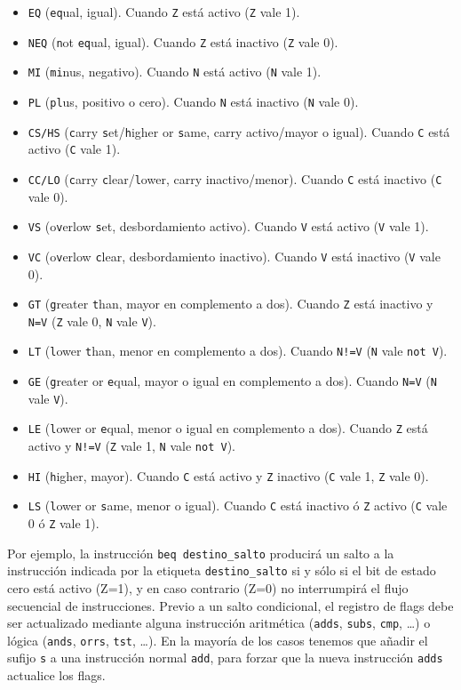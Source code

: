 \begin{itemize}
  \item{\tt EQ} ({\tt eq}ual, igual). Cuando {\tt Z} está activo ({\tt Z} vale 1).
  \item{\tt NEQ} ({\tt n}ot {\tt eq}ual, igual). Cuando {\tt Z} está inactivo ({\tt Z} vale 0).
  \item{\tt MI} ({\tt mi}nus, negativo). Cuando {\tt N} está activo ({\tt N} vale 1).
  \item{\tt PL} ({\tt pl}us, positivo o cero). Cuando {\tt N} está inactivo ({\tt N} vale 0).
  \item{\tt CS/HS} ({\tt c}arry {\tt s}et/{\tt h}igher or {\tt s}ame, carry activo/mayor o igual). Cuando {\tt C} está activo ({\tt C} vale 1).
  \item{\tt CC/LO} ({\tt c}arry {\tt c}lear/{\tt l}ower, carry inactivo/menor). Cuando {\tt C} está inactivo ({\tt C} vale 0).
  \item{\tt VS} (o{\tt v}erlow {\tt s}et, desbordamiento activo). Cuando {\tt V} está activo ({\tt V} vale 1).
  \item{\tt VC} (o{\tt v}erlow {\tt c}lear, desbordamiento inactivo). Cuando {\tt V} está inactivo ({\tt V} vale 0).
  \item{\tt GT} ({\tt g}reater {\tt t}han, mayor en complemento a dos). Cuando {\tt Z} está inactivo y {\tt N=V} ({\tt Z} vale 0, {\tt N} vale {\tt V}).
  \item{\tt LT} ({\tt l}ower {\tt t}han, menor en complemento a dos). Cuando {\tt N!=V} ({\tt N} vale {\tt not V}).
  \item{\tt GE} ({\tt g}reater or {\tt e}qual, mayor o igual en complemento a dos). Cuando {\tt N=V} ({\tt N} vale {\tt V}).
  \item{\tt LE} ({\tt l}ower or {\tt e}qual, menor o igual en complemento a dos). Cuando {\tt Z} está activo y {\tt N!=V} ({\tt Z} vale 1, {\tt N} vale {\tt not V}).
  \item{\tt HI} ({\tt h}igher, mayor). Cuando {\tt C} está activo y {\tt Z} inactivo ({\tt C} vale 1, {\tt Z} vale 0).
  \item{\tt LS} ({\tt l}ower or {\tt s}ame, menor o igual). Cuando {\tt C} está inactivo ó {\tt Z} activo ({\tt C} vale 0 ó {\tt Z} vale 1).
\end{itemize}

Por ejemplo, la instrucción {\tt beq destino\_salto} producirá un salto
a la instrucción indicada por la etiqueta {\tt destino\_salto} si y sólo
si el bit de estado cero está activo (Z=1), y en caso contrario
(Z=0) no interrumpirá el flujo secuencial de instrucciones.
Previo a un salto condicional, el registro de flags debe ser actualizado
mediante alguna instrucción aritmética ({\tt adds}, {\tt subs}, {\tt cmp},
\dots) o lógica ({\tt ands}, {\tt orrs}, {\tt tst}, \dots). En la mayoría
de los casos tenemos que añadir el sufijo {\tt s} a una instrucción normal
{\tt add}, para forzar que la nueva instrucción {\tt adds} actualice los flags.

